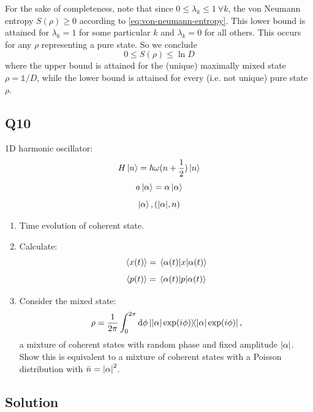 \documentclass[12pt]{article}
\newcommand*\id{\mathds{1}}
\begin{document}
\begin{appendices}
For the sake of completeness, note that since $0 \leq \lambda_k \leq 1\ \forall k$, the von Neumann entropy $S(\rho) \geq 0$ according to \eqref{eq:von-neumann-entropy}. This lower bound is attained for $\lambda_k = 1$ for some particular $k$ and $\lambda_k = 0$ for all others. This occurs for any $\rho$ representing a pure state. So we conclude
\begin{equation}
    0 \leq S(\rho) \leq \ln D
\end{equation}
where the upper bound is attained for the (unique) maximally mixed state $\rho = \id/D$, while the lower bound is attained for every (i.e. not unique) pure state $\rho$.


\subsection*{Q10}
1D harmonic oscillator:
\[H\ket{n} = \hbar\omega(n+\frac{1}{2})\ket{n}\]
\[a\ket{\alpha} = \alpha\ket\alpha\]
\[\ket\alpha, (\abs{\alpha}, n)\]
\begin{enumerate}[label=\alph*)]
    \item Time evolution of coherent state.
    \item Calculate:
        \[\ev{x(t)} = \ev{x}{\alpha(t)}\]
        \[\ev{p(t)} = \ev{p}{\alpha(t)}\]
    \item Consider the mixed state:
        \[\rho = \frac{1}{2\pi} \int_0^{2\pi}\dd{\phi} \ketbra{\abs{\alpha} \exp(i\phi)},\]
        a mixture of coherent states with random phase and fixed amplitude $\abs{\alpha}$. Show this is equivalent to a mixture of coherent states with a Poisson distribution with $\bar{n} = \abs{\alpha}^2$.
\end{enumerate}

\subsection*{Solution}


\end{appendices}
\end{document}
